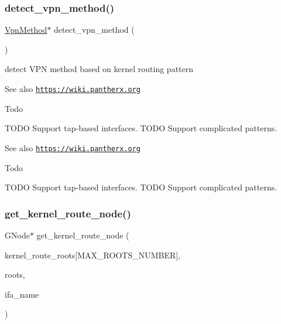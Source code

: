\subsubsection{\texorpdfstring{detect\+\_\+vpn\+\_\+method()}{detect\_vpn\_method()}}
{\footnotesize\ttfamily \hyperlink{route-tree_8h_a1034dd038389279bf422489d4d99d43a}{Vpn\+Method}$\ast$ detect\+\_\+vpn\+\_\+method (\begin{DoxyParamCaption}{ }\end{DoxyParamCaption})}



detect V\+PN method based on kernel routing pattern 

\begin{DoxySeeAlso}{See also}
\href{https://wiki.pantherx.org}{\tt https\+://wiki.\+pantherx.\+org} 
\end{DoxySeeAlso}
\begin{DoxyRefDesc}{Todo}
\item[\hyperlink{todo__todo000023}{Todo}]T\+O\+DO Support tap-\/based interfaces. T\+O\+DO Support complicated patterns. \end{DoxyRefDesc}


\begin{DoxySeeAlso}{See also}
\href{https://wiki.pantherx.org}{\tt https\+://wiki.\+pantherx.\+org} 
\end{DoxySeeAlso}
\begin{DoxyRefDesc}{Todo}
\item[\hyperlink{todo__todo000019}{Todo}]T\+O\+DO Support tap-\/based interfaces. T\+O\+DO Support complicated patterns. \end{DoxyRefDesc}
\mbox{\label{route-tree_8h_a77affcaa875961893c05c7e211678ed1}} 
\subsubsection{\texorpdfstring{get\+\_\+kernel\+\_\+route\+\_\+node()}{get\_kernel\_route\_node()}}
{\footnotesize\ttfamily G\+Node$\ast$ get\+\_\+kernel\+\_\+route\+\_\+node (\begin{DoxyParamCaption}\item[{G\+Node $\ast$}]{kernel\+\_\+route\+\_\+roots\mbox{[}\+M\+A\+X\+\_\+\+R\+O\+O\+T\+S\+\_\+\+N\+U\+M\+B\+E\+R\mbox{]},  }\item[{int}]{roots,  }\item[{char $\ast$}]{ifa\+\_\+name }\end{DoxyParamCaption})}



